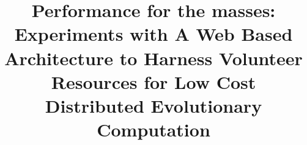 \documentclass{sig-alternate}
\begin{document}


\title{Performance for the masses: Experiments with A Web Based Architecture to Harness Volunteer Resources 
for Low Cost Distributed Evolutionary Computation}
%
%
%
%
%

%
\end{document}

